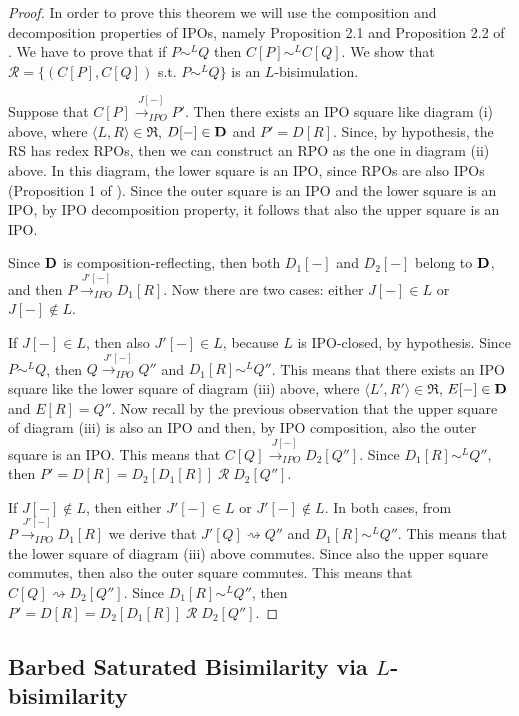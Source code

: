 \documentclass[copyright,creativecommons]{eptcs}
\makeatletter
\newcommand{\bisl}{\sim^{L}}
\def\IPOtr#1{\stackrel{#1}{\rightarrowfill_{IPO}}}
\def \rightarrowfill{\m@th\mathord{\smash-}\mkern-6mu\cleaders\hbox{$\mkern-2mu\mathord{\smash-}\mkern-2mu$}\hfill
  \mkern-6mu\mathord\rightarrow}
\newcommand{\Cat}[1]{{\bf #1}}
\newcommand{\Rules}[1]{\mathfrak{#1}}
\def\IPOtr#1{\stackrel{#1}{\rightarrow_{IPO}}}
\newcommand{\react}{\rightsquigarrow}
\newcommand{\<}{\langle}
\renewcommand{\>}{\rangle}
\def \rightarrowfill{\m@th\mathord{\smash-}\mkern-6mu\cleaders\hbox{$\mkern-2mu\mathord{\smash-}\mkern-2mu$}\hfill
  \mkern-6mu\mathord\rightarrow}
\makeatother
\begin{document}
\begin{proof}

  In order to prove this theorem we will use the composition and decomposition properties
  of IPOs, namely Proposition 2.1 and Proposition 2.2 of \cite{DBLP:conf/concur/LeiferM00}.
  We have to prove that if $P\bisl Q$ then $C[P]\bisl C[Q]$.
We show that $\mathcal R=\{(C[P],C[Q])$ s.t. $P\bisl Q
\}$ is an $L$-bisimulation.



  Suppose that $C[P]\IPOtr{J[-]}P'$. Then there exists
  an IPO square like diagram (i) above, where
 $\<L,R\>\in \Rules{R}$, $D[-]\in \Cat{D}$
  and $P'=D[R]$. Since, by hypothesis, the RS has
  redex RPOs, then we can construct an RPO as the one in diagram
  (ii) above. In this diagram, the lower square is an IPO, since RPOs
  are also IPOs (Proposition 1 of
  \cite{DBLP:conf/concur/LeiferM00}). Since the outer square is an IPO and the
  lower square is an IPO, by IPO decomposition property, it follows that
 also the upper square is an IPO.

Since $\Cat{D}$ is composition-reflecting, then both $D_1[-]$ and
$D_2[-]$ belong to $\Cat{D}$, and then $P\IPOtr{J'[-]}D_1[R]$. Now there
are two cases: either $J[-]\in L$ or $J[-]\notin L$.

If $J[-]\in L$, then also $J'[-]\in L$, because $L$ is IPO-closed,
by hypothesis. Since $P \bisl Q$, then $Q\IPOtr{J'[-]}Q''$ and $D_1[R]
\bisl Q''$. This means that there exists an IPO square like the
lower square of diagram (iii) above, where $\<L',R'\>\in \Rules{R}$,
$E[-]\in \Cat{D}$ and $E[R]=Q''$. Now recall by the previous
observation that the upper square of diagram (iii) is also an IPO
and then, by IPO composition, also the outer square is an IPO. This
means that $C[Q]\IPOtr{J[-]}D_2[Q'']$. Since $D_1[R] \bisl Q''$, then
$P'=D[R]=D_2[D_1[R]] \;\mathcal R\; D_2[Q'']$.

If $J[-]\notin L$, then either $J'[-]\in L$ or $J'[-]\notin L$. In both
cases, from $P\IPOtr{J'[-]}D_1[R]$ we derive that $J'[Q]\react Q''$ and
$D_1[R] \bisl Q''$. This means that the lower square of diagram
(iii) above commutes. Since also the upper square commutes, then
also the outer square commutes. This means that $C[Q]\react
D_2[Q'']$. Since $D_1[R] \bisl Q''$, then $P'=D[R]=D_2[D_1[R]] \;
\mathcal R \; D_2[Q'']$.
\end{proof}

\subsection{Barbed Saturated Bisimilarity via $L$-bisimilarity}\label{L=BS}
\end{document}
